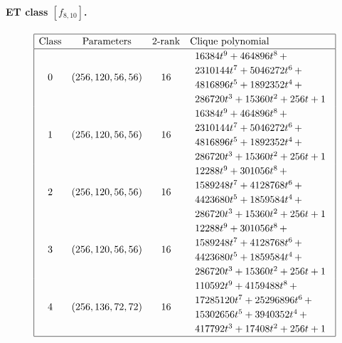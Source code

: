 \documentclass[12pt,a4paper]{article}
\begin{document}
\paragraph*{ET class $[f_{8,10}]$.}
%
\begin{table}[!bhpt] %
\small{}
\begin{align*}
\def\arraystretch{1.2}
\begin{array}{|cccl|}
\hline
\text{Class} &
\text{Parameters} &
\text{2-rank} &
\text{Clique polynomial}
\\
\hline
0 &
(256, 120, 56, 56) &
16 &
\begin{array}{l}
16384t^{9} + 464896t^{8}
\,+
\\
 2310144t^{7} + 5046272t^{6}
\,+
\\
 4816896t^{5} + 1892352t^{4}
\,+
\\
 286720t^{3} + 15360t^{2} + 256t + 1
\end{array}
\\
1 &
(256, 120, 56, 56) &
16 &
\begin{array}{l}
16384t^{9} + 464896t^{8}
\,+
\\
 2310144t^{7} + 5046272t^{6}
\,+
\\
 4816896t^{5} + 1892352t^{4}
\,+
\\
 286720t^{3} + 15360t^{2} + 256t + 1
\end{array}
\\
2 &
(256, 120, 56, 56) &
16 &
\begin{array}{l}
12288t^{9} + 301056t^{8}
\,+
\\
 1589248t^{7} + 4128768t^{6}
\,+
\\
 4423680t^{5} + 1859584t^{4}
\,+
\\
 286720t^{3} + 15360t^{2} + 256t + 1
\end{array}
\\
3 &
(256, 120, 56, 56) &
16 &
\begin{array}{l}
12288t^{9} + 301056t^{8}
\,+
\\
 1589248t^{7} + 4128768t^{6}
\,+
\\
 4423680t^{5} + 1859584t^{4}
\,+
\\
 286720t^{3} + 15360t^{2} + 256t + 1
\end{array}
\\
4 &
(256, 136, 72, 72) &
16 &
\begin{array}{l}
110592t^{9} + 4159488t^{8}
\,+
\\
 17285120t^{7} + 25296896t^{6}
\,+
\\
 15302656t^{5} + 3940352t^{4}
\,+
\\
 417792t^{3} + 17408t^{2} + 256t + 1
\end{array}
\\
\hline
\end{array}
\end{align*}
\caption{$f_{8,10}$ extended Cayley classes (part 1)}
\label{tab-c8_10_EC_classes}
\end{table}
\end{document}
